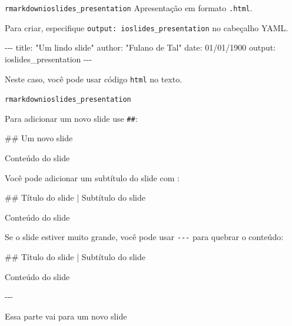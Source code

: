 \documentclass[
  10pt,
  ignorenonframetext,
]{beamer}
\newenvironment{Shaded}{\begin{snugshade}}{\end{snugshade}}
\newcommand{\AttributeTok}[1]{\textcolor[rgb]{0.40,0.45,0.13}{#1}}
\newcommand{\FunctionTok}[1]{\textcolor[rgb]{0.28,0.35,0.67}{#1}}
\newcommand{\KeywordTok}[1]{\textcolor[rgb]{0.00,0.23,0.31}{#1}}
\newcommand{\NormalTok}[1]{\textcolor[rgb]{0.00,0.23,0.31}{#1}}
\newcommand{\PreprocessorTok}[1]{\textcolor[rgb]{0.68,0.00,0.00}{#1}}
\newcommand{\StringTok}[1]{\textcolor[rgb]{0.13,0.47,0.30}{#1}}
\begin{document}
\begin{frame}[fragile]{\texttt{rmarkdown}\newline \texttt{ioslides\_presentation}}
\protect\hypertarget{rmarkdownioslides_presentation}{}
Apresentação em formato \texttt{.html}.

Para criar, especifique \texttt{output:\ ioslides\_presentation} no
cabeçalho YAML.

\begin{Shaded}
\begin{Highlighting}[]
\PreprocessorTok{{-}{-}{-}}
\FunctionTok{title}\KeywordTok{:}\AttributeTok{ }\StringTok{"Um lindo slide"}
\FunctionTok{author}\KeywordTok{:}\AttributeTok{ }\StringTok{"Fulano de Tal"}
\FunctionTok{date}\KeywordTok{:}\AttributeTok{ 01/01/1900}
\FunctionTok{output}\KeywordTok{:}\AttributeTok{ ioslides\_presentation}
\PreprocessorTok{{-}{-}{-}}
\end{Highlighting}
\end{Shaded}

\colorbox{cabecalho}{\textcolor{titulo}{Neste caso, você pode usar código \texttt{html} no texto.}}
\end{frame}

\begin{frame}[fragile]{\texttt{rmarkdown}\newline \texttt{ioslides\_presentation}}
\protect\hypertarget{rmarkdownioslides_presentation-1}{}
\small

Para adicionar um novo slide use \texttt{\#\#}:

\begin{Shaded}
\begin{Highlighting}[]
\FunctionTok{\#\# Um novo slide}

\NormalTok{Conteúdo do slide}
\end{Highlighting}
\end{Shaded}

Você pode adicionar um subtítulo do slide com \texttt{\textbar{}}:

\begin{Shaded}
\begin{Highlighting}[]
\FunctionTok{\#\# Título do slide | Subtítulo do slide}

\NormalTok{Conteúdo do slide}
\end{Highlighting}
\end{Shaded}

Se o slide estiver muito grande, você pode usar \texttt{-\/-\/-} para
quebrar o conteúdo:

\begin{Shaded}
\begin{Highlighting}[]
\FunctionTok{\#\# Título do slide | Subtítulo do slide}

\NormalTok{Conteúdo do slide}

\NormalTok{{-}{-}{-}}

\NormalTok{Essa parte vai para um novo slide}
\end{Highlighting}
\end{Shaded}

\normalsize
\end{frame}
\end{document}
